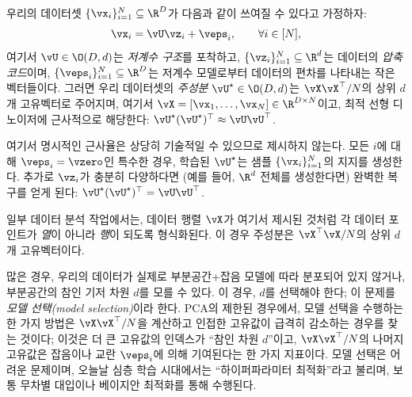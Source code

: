 \documentclass[../../book-main_ko.tex]{subfiles}
\begin{document}
\begin{theorem}\label{thm:pca}
    우리의 데이터셋 \(\{\vx_{i}\}_{i = 1}^{N} \subseteq \R^{D}\)가 다음과 같이 쓰여질 수 있다고 가정하자:
    \begin{equation}
        \vx_{i} = \vU\vz_{i} + \veps_{i}, \qquad \forall i \in [N],
    \end{equation}
    여기서 \(\vU \in \O(D, d)\)는 \textit{저계수 구조}를 포착하고, \(\{\vz_{i}\}_{i = 1}^{N} \subseteq \R^{d}\)는 데이터의 \textit{압축 코드}이며, \(\{\veps_{i}\}_{i = 1}^{N} \subseteq \R^{D}\)는 저계수 모델로부터 데이터의 편차를 나타내는 작은 벡터들이다. 그러면 우리 데이터셋의 \textit{주성분} \(\vU^{\star} \in \O(D, d)\)는 \(\vX\vX^{\top}/N\)의 상위 \(d\)개 고유벡터로 주어지며, 여기서 \(\vX = [\vx_{1}, \dots, \vx_{N}] \in \R^{D \times N}\)이고, 최적 선형 디노이저에 근사적으로 해당한다: \(\vU^{\star}(\vU^{\star})^{\top} \approx \vU\vU^{\top}\).
\end{theorem}
여기서 명시적인 근사율은 상당히 기술적일 수 있으므로 제시하지 않는다. 모든 \(i\)에 대해 \(\veps_{i} = \vzero\)인 특수한 경우, 학습된 \(\vU^{\star}\)는 샘플 \(\{\vx_{i}\}_{i = 1}^{N}\)의 지지를 생성한다. 추가로 \(\vz_{i}\)가 충분히 다양하다면 (예를 들어, \(\R^{d}\) 전체를 생성한다면) 완벽한 복구를 얻게 된다: \(\vU^{\star}(\vU^{\star})^{\top} = \vU\vU^{\top}\).


\begin{remark}
    일부 데이터 분석 작업에서는, 데이터 행렬 \(\vX\)가 여기서 제시된 것처럼 각 데이터 포인트가 \textit{열}이 아니라 \textit{행}이 되도록 형식화된다. 이 경우 주성분은 \(\vX^{\top}\vX/N\)의 상위 \(d\)개 고유벡터이다.
\end{remark}


\begin{remark}
    많은 경우, 우리의 데이터가 실제로 부분공간+잡음 모델에 따라 분포되어 있지 않거나, 부분공간의 참인 기저 차원 \(d\)를 모를 수 있다. 이 경우, \(d\)를 선택해야 한다; 이 문제를 \textit{모델 선택(model selection)}이라 한다. PCA의 제한된 경우에서, 모델 선택을 수행하는 한 가지 방법은 \(\vX\vX^{\top}/N\)을 계산하고 인접한 고유값이 급격히 감소하는 경우를 찾는 것이다; 이것은 더 큰 고유값의 인덱스가 ``참인 차원 \(d\)''이고, \(\vX\vX^{\top}/N\)의 나머지 고유값은 잡음이나 교란 \(\veps_{i}\)에 의해 기여된다는 한 가지 지표이다. 모델 선택은 어려운 문제이며, 오늘날 심층 학습 시대에서는 ``하이퍼파라미터 최적화''라고 불리며, 보통 무차별 대입이나 베이지안 최적화를 통해 수행된다. %
\end{remark}
\end{document}
